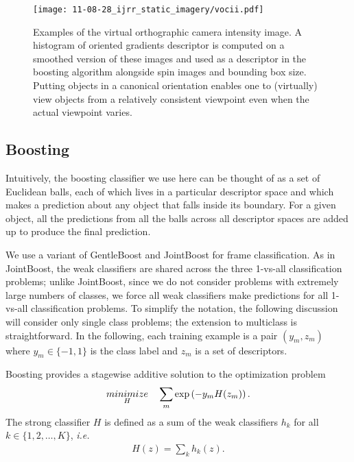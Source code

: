 \documentclass[conference]{IEEEtran}
\begin{document}
\begin{figure}
  \centering
  \texttt{[image: 11-08-28\_ijrr\_static\_imagery/vocii.pdf]}
  \caption{Examples of the virtual orthographic camera intensity image.  A histogram of oriented gradients descriptor is computed on a smoothed version of these images and used as a descriptor in the boosting algorithm alongside spin images and bounding box size. Putting objects in a canonical orientation enables one to (virtually) view objects from a relatively consistent viewpoint even when the actual viewpoint varies.}
  \label{fig:vocii}
\end{figure}


\subsection{Boosting}
\label{sec:boosting}

Intuitively, the boosting classifier we use here can be thought of as a set of Euclidean balls, each of which lives in a particular descriptor space and which makes a prediction about any object that falls inside its boundary.  For a given object, all the predictions from all the balls across all descriptor spaces are added up to produce the final prediction.

We use a variant of GentleBoost \citep{Friedman2000} and JointBoost \citep{Torralba2004} for frame classification.  As in JointBoost, the weak classifiers are shared across the three 1-vs-all classification problems; unlike JointBoost, since we do not consider problems with extremely large numbers of classes, we force all weak classifiers make predictions for all 1-vs-all classification problems.  To simplify the notation, the following discussion will consider only single class problems; the extension to multiclass is straightforward.  In the following, each training example is a pair $(y_m, z_m)$ where $y_m \in \{-1, 1\}$ is the class label and $z_m$ is a set of descriptors.

Boosting provides a stagewise additive solution to the optimization problem
\begin{align}
  \minimize{H} \quad \sum_m \exp \left(-y_m H(z_m) \right).     \label{eqn:boosting}
\end{align}
The strong classifier $H$ is defined as a sum of the weak classifiers $h_k$ for all $k \in \{1, 2, \dots, K\}$, \textit{i.e.}
\begin{align*}
  H(z) = \sum_k h_k(z).
\end{align*}
\end{document}
